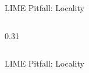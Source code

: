 \documentclass[10pt,compress,t,notes=noshow, xcolor=table]{beamer}
\begin{document}
\begin{frame}{LIME Pitfall: Locality}
\begin{columns}[T, totalwidth=\textwidth]
\begin{column}{0.31\textwidth}
         \end{column}
     \end{columns}
\end{frame}

\begin{frame}{LIME Pitfall: Locality }


\end{frame}
\end{document}
